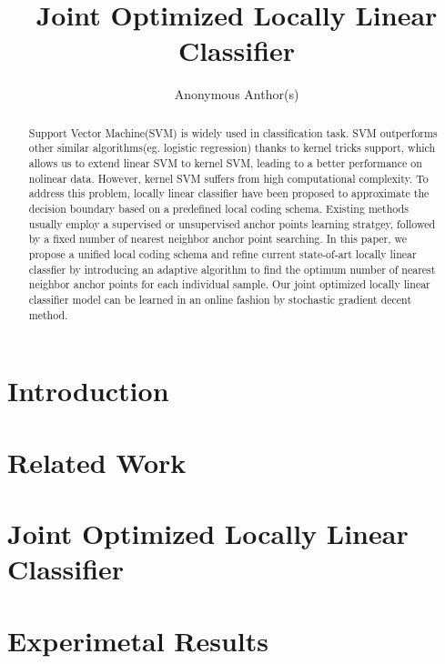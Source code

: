 \documentclass{llncs}
\begin{document}
	\title{Joint Optimized Locally Linear Classifier}
	\author{Anonymous Anthor(s)}
	\maketitle
	
	\begin{abstract}
	Support Vector Machine(SVM) is widely used in classification task. SVM outperforms other similar algorithms(eg. logistic regression) thanks to kernel tricks support, which allows us to extend linear SVM to kernel SVM, leading to a better performance on nolinear data. However, kernel SVM suffers from high computational complexity. To address this problem, locally linear classifier have been proposed to approximate the decision boundary based on a predefined local coding schema. Existing methods usually employ a supervised or unsupervised anchor points learning stratgey, followed by a fixed number of nearest neighbor anchor point searching. In this paper, we propose a unified local coding schema and refine current state-of-art locally linear classfier by introducing an adaptive algorithm to find the optimum number of nearest neighbor anchor points for each individual sample. Our joint optimized locally linear classifier model can be learned in an online fashion by stochastic gradient decent method.
 	\end{abstract}
	
	\section{Introduction}
	
	\section{Related Work}
	
	\section{Joint Optimized Locally Linear Classifier}
	
	\section{Experimetal Results}
\end{document}
